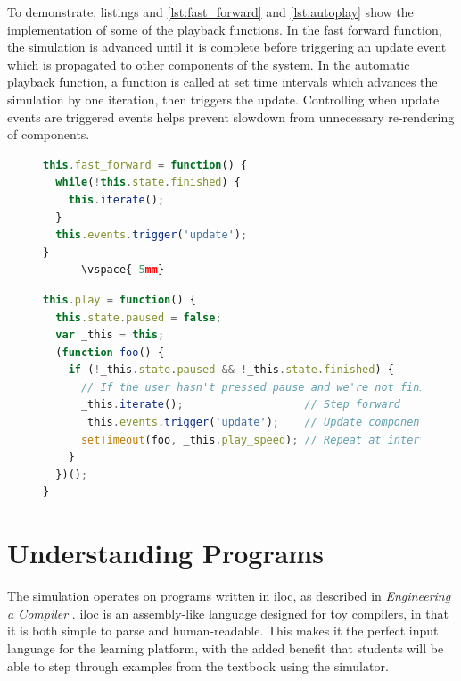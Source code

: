 \documentclass[bsc,twoside,singlespacing,parskip,logo,notimes,normalheadings]{infthesis}
\begin{document}
    To demonstrate, listings and \ref{lst:fast_forward} and
    \ref{lst:autoplay} show the implementation of some of the playback
    functions. In the fast forward function, the simulation is
    advanced until it is complete before triggering an update event
    which is propagated to other components of the system. In the
    automatic playback function, a function is called at set time
    intervals which advances the simulation by one iteration, then
    triggers the update. Controlling when update events are triggered
    events helps prevent slowdown from unnecessary re-rendering of
    components.

    \begin{figure}[!ht]
      \vspace{-5mm}
      \begin{lstlisting}[language=JavaScript, caption={JavaScript Implementation of Fast Forward}, label={lst:fast_forward}]
this.fast_forward = function() {
  while(!this.state.finished) {
    this.iterate();
  }
  this.events.trigger('update');
}
      \vspace{-5mm}
      \end{lstlisting}
    \end{figure}

    \begin{figure}[!ht]
      \vspace{-10mm}
      \begin{lstlisting}[language=JavaScript, caption={JavaScript Implementation of Automatic Playback}, label={lst:autoplay}]
this.play = function() {
  this.state.paused = false;
  var _this = this;
  (function foo() {
    if (!_this.state.paused && !_this.state.finished) {
      // If the user hasn't pressed pause and we're not finished
      _this.iterate();                   // Step forward
      _this.events.trigger('update');    // Update components
      setTimeout(foo, _this.play_speed); // Repeat at interval
    }
  })();
}
      \end{lstlisting}
\vspace{-25mm}
    \end{figure}
    
    \section{Understanding Programs}\label{sec:impl-iloc}
    The simulation operates on programs written in \gls{iloc}, as
    described in {\em Engineering a Compiler}
    \cite[appx.~A]{eac}. \gls{iloc} is an assembly-like language
    designed for toy compilers, in that it is both simple to parse and
    human-readable. This makes it the perfect input language for the
    learning platform, with the added benefit that students will be
    able to step through examples from the textbook using the
    simulator.
\end{document}
